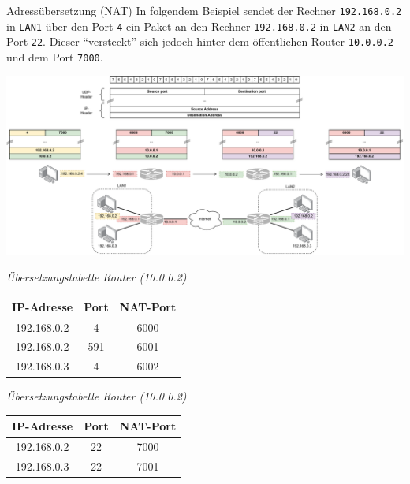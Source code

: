 \begin{example}{Adressübersetzung (NAT)}
    In folgendem Beispiel sendet der Rechner \texttt{192.168.0.2} in \texttt{LAN1} über den Port \texttt{4} ein Paket an den Rechner \texttt{192.168.0.2} in \texttt{LAN2} an den Port \texttt{22}.
    Dieser \enquote{versteckt} sich jedoch hinter dem öffentlichen Router \texttt{10.0.0.2} und dem Port \texttt{7000}.

    \includegraphics[width=\textwidth]{includes/figures/example_nat.pdf}

    \begin{minipage}[t]{0.5\textwidth}
        \begin{center}
            \emph{Übersetzungstabelle Router (10.0.0.2)}

            \begin{tabular}{|c|c||c|}
                \hline
                IP-Adresse  & Port & NAT-Port \\\hline\hline
                192.168.0.2 & 4    & 6000     \\\hline
                192.168.0.2 & 591  & 6001     \\\hline
                192.168.0.3 & 4    & 6002     \\\hline
            \end{tabular}
        \end{center}
    \end{minipage}
    \begin{minipage}[t]{0.5\textwidth}
        \begin{center}
            \emph{Übersetzungstabelle Router (10.0.0.2)}

            \begin{tabular}{|c|c||c|}
                \hline
                IP-Adresse  & Port & NAT-Port \\\hline\hline
                192.168.0.2 & 22   & 7000     \\\hline
                192.168.0.3 & 22   & 7001     \\\hline
            \end{tabular}
        \end{center}
    \end{minipage}
\end{example}

